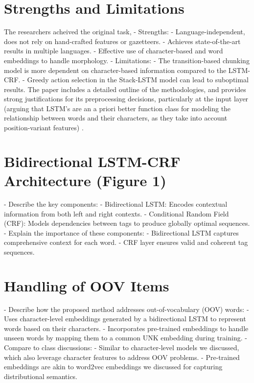 \documentclass[11pt]{article}
\begin{document}


\section*{Strengths and Limitations}
The researchers acheived the original task, 
- Strengths:
  - Language-independent, does not rely on hand-crafted features or gazetteers.
  - Achieves state-of-the-art results in multiple languages.
  - Effective use of character-based and word embeddings to handle morphology.
- Limitations:
  - The transition-based chunking model is more dependent on character-based information compared to the LSTM-CRF.
  - Greedy action selection in the Stack-LSTM model can lead to suboptimal results.
  The paper includes a detailed outline
  of the methodologies, and provides strong 
  justifications for its preprocessing decisions, 
  particularly at the input layer (arguing that LSTM's 
  are an a priori better function class for modeling 
  the relationship between words and their characters, 
  as they take into account position-variant features) .
\section*{Bidirectional LSTM-CRF Architecture (Figure 1)}
- Describe the key components:
  - Bidirectional LSTM: Encodes contextual information from both left and right contexts.
  - Conditional Random Field (CRF): Models dependencies between tags to produce globally optimal sequences.
- Explain the importance of these components:
  - Bidirectional LSTM captures comprehensive context for each word.
  - CRF layer ensures valid and coherent tag sequences.

\section*{Handling of OOV Items}
- Describe how the proposed method addresses out-of-vocabulary (OOV) words:
  - Uses character-level embeddings generated by a bidirectional LSTM to represent words based on their characters.
  - Incorporates pre-trained embeddings to handle unseen words by mapping them to a common UNK embedding during training.
- Compare to class discussions:
  - Similar to character-level models we discussed, which also leverage character features to address OOV problems.
  - Pre-trained embeddings are akin to word2vec embeddings we discussed for capturing distributional semantics.
\end{document}
